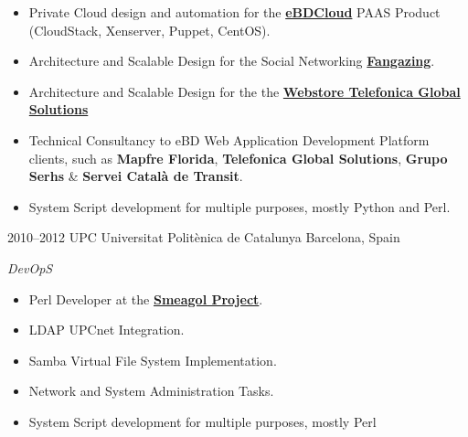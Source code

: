 \documentclass[]{friggeri-cv} %
\begin{document}
\begin{entrylist}
{\begin{itemize}
\item Private Cloud design and automation for the  \href{http://www.ebdcloud.com}{\textbf{eBDCloud}} PAAS Product (CloudStack, Xenserver, Puppet, CentOS).
\item Architecture and Scalable Design for the Social Networking \href{http://www.fangazing.com/berto}{\textbf{Fangazing}}.
\item Architecture and Scalable Design for the the \href{https://webstore.telefonicaglobalsolutions.com}{\textbf{Webstore Telefonica Global Solutions}}
\item Technical Consultancy to eBD Web Application Development Platform clients, such as \textbf{Mapfre Florida}, \textbf{Telefonica Global Solutions}, \textbf{Grupo Serhs} \& \textbf{Servei Català de Transit}.
\item System Script development for multiple purposes, mostly Python and Perl.   
\end{itemize}}
\entry
{2010--2012}
{UPC Universitat Politènica de Catalunya}
{Barcelona, Spain}
{\emph{DevOpS} \\
\begin{itemize}
\item Perl Developer at the \href{https://github.com/smeagol-upc/smeagol-perl}{\textbf{Smeagol Project}}.
\item LDAP UPCnet Integration.
\item Samba Virtual File System Implementation.
\item Network and System Administration Tasks.
\item System Script development for multiple purposes, mostly Perl
\end{itemize}}
\end{entrylist}
\end{document}
